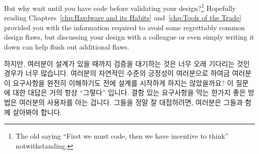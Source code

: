 But why wait until you have code before validating your design?\footnote{
	The old saying ``First we must code, then we have incentive to
	think'' notwithstanding.}
Hopefully reading Chapters~\ref{chp:Hardware and its Habits}
and~\ref{chp:Tools of the Trade} provided you with the information
required to avoid some regrettably common design flaws,
but discussing your design with a colleague or even simply writing it
down can help flush out additional flaws.

\fi

하지만, 여러분이 설계가 있을 때까지 검증을 대기하는 것은 너무 오래 기다리는
것인 경우가 너무 많습니다.
여러분의 자연적인 수준의 긍정성이 여러분으로 하여금 여러분이 요구사항을 완전히
이해하기도 전에 설계를 시작하게 하지는 않았을까요?
이 질문에 대한 대답은 거의 항상 ``그렇다'' 입니다.
결함 있는 요구사항을 막는 한가지 좋은 방법은 여러분의 사용자를 아는 겁니다.
그들을 정말 잘 대접하려면, 여러분은 그들과 함께 살아봐야 합니다.

